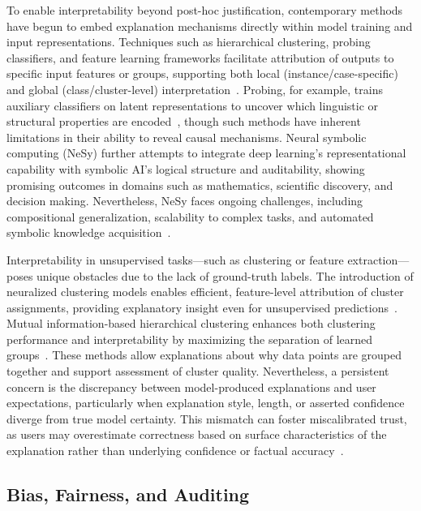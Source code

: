 \documentclass[sigconf]{acmart}
\begin{document}
To enable interpretability beyond post-hoc justification, contemporary methods have begun to embed explanation mechanisms directly within model training and input representations. Techniques such as hierarchical clustering, probing classifiers, and feature learning frameworks facilitate attribution of outputs to specific input features or groups, supporting both local (instance/case-specific) and global (class/cluster-level) interpretation~\cite{ref14, ref36, ref52, ref83}. Probing, for example, trains auxiliary classifiers on latent representations to uncover which linguistic or structural properties are encoded~\cite{ref14}, though such methods have inherent limitations in their ability to reveal causal mechanisms. Neural symbolic computing (NeSy) further attempts to integrate deep learning’s representational capability with symbolic AI’s logical structure and auditability, showing promising outcomes in domains such as mathematics, scientific discovery, and decision making. Nevertheless, NeSy faces ongoing challenges, including compositional generalization, scalability to complex tasks, and automated symbolic knowledge acquisition~\cite{ref19, ref35, ref49, ref73, ref84}.

Interpretability in unsupervised tasks---such as clustering or feature extraction---poses unique obstacles due to the lack of ground-truth labels. The introduction of neuralized clustering models enables efficient, feature-level attribution of cluster assignments, providing explanatory insight even for unsupervised predictions~\cite{ref83}. Mutual information-based hierarchical clustering enhances both clustering performance and interpretability by maximizing the separation of learned groups~\cite{ref85}. These methods allow explanations about why data points are grouped together and support assessment of cluster quality. Nevertheless, a persistent concern is the discrepancy between model-produced explanations and user expectations, particularly when explanation style, length, or asserted confidence diverge from true model certainty. This mismatch can foster miscalibrated trust, as users may overestimate correctness based on surface characteristics of the explanation rather than underlying confidence or factual accuracy~\cite{ref35, ref49, ref81}.

\subsection{Bias, Fairness, and Auditing}
\end{document}
